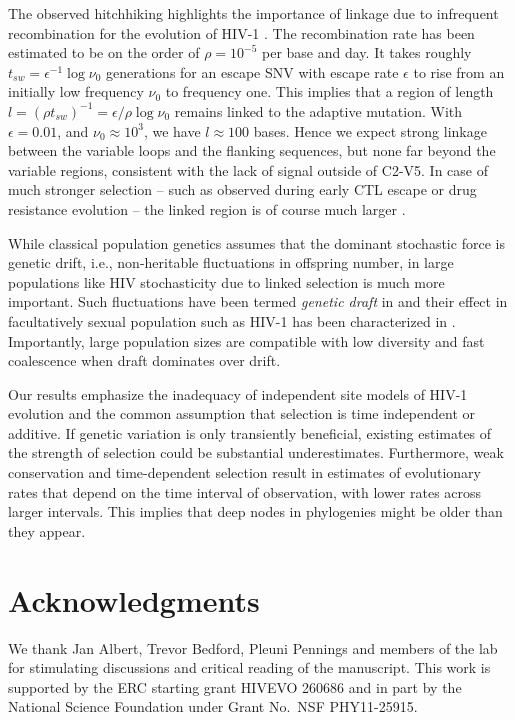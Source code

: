 \documentclass[11pt]{article}
\newcommand{\shankaregion}{C2-V5}
\begin{document}
The observed hitchhiking highlights the importance of linkage due to
infrequent recombination for the evolution of HIV-1
\citep{neher_recombination_2010, batorsky_estimate_2011,
josefsson_majority_2011}. The recombination rate has been estimated to be on the
order of $\rho = 10^{-5}$ per base and day. It takes roughly $t_{sw} =
\epsilon^{-1} \log \nu_0$ generations for an escape SNV with escape rate
$\epsilon$ to rise from an initially low frequency $\nu_0$ to frequency
one. This implies that a region of length $l = (\rho t_{sw})^{-1} = \epsilon /
\rho \log \nu_0$ remains linked to the adaptive mutation. With
$\epsilon=0.01$, and $\nu_0\approx 10^{3}$, 
we have $l\approx 100$ bases. Hence we expect strong linkage between the
variable loops and the flanking sequences, but none far beyond the variable
regions, consistent with the lack of signal outside of \shankaregion. In case of
much stronger selection -- such as observed during early CTL escape or drug
resistance evolution -- the linked region is of course much larger
\citep{nijhuis_stochastic_1998}. 

While classical population genetics assumes that the dominant stochastic force
is genetic drift, i.e., non-heritable fluctuations in offspring number,
in large populations like HIV stochasticity due to linked selection is much more important.
Such fluctuations have been termed \emph{genetic draft} in
\citet{gillespie_genetic_2000} and their effect in facultatively sexual population
such as HIV-1 has been characterized in \citep{neher_genetic_2011}. Importantly,
large population sizes are compatible with low diversity and fast coalescence
when draft dominates over drift.

Our results emphasize the inadequacy of independent site models of HIV-1 evolution
and the common assumption that selection is time independent or additive. 
If genetic variation is only transiently beneficial, existing estimates of the
strength of selection \citep{neher_recombination_2010,batorsky_estimate_2011}
could be substantial underestimates. Furthermore, weak conservation and
time-dependent selection result in estimates of evolutionary 
rates that depend on the time interval of observation, with lower rates across
larger intervals. This implies that deep nodes in phylogenies might be older than 
they appear.


\section*{Acknowledgments}
We thank Jan Albert, Trevor Bedford, Pleuni Pennings and members of the lab for 
stimulating discussions and critical reading of the manuscript.
This work is supported by the ERC starting grant HIVEVO 260686 and 
in part by the National Science Foundation under Grant No.~NSF PHY11-25915.
\end{document}
